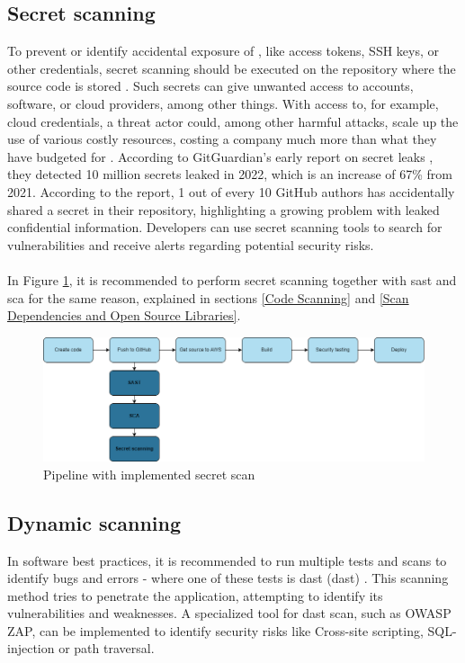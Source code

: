 \subsection{Secret scanning}
To prevent or identify accidental exposure of , like access tokens, SSH keys, or other credentials, secret scanning should be executed on the repository where the source code is stored \cite{GithubSecretScanning}. Such secrets can give unwanted access to accounts, software, or cloud providers, among other things. With access to, for example, cloud credentials, a threat actor could, among other harmful attacks, scale up the use of various costly resources, costing a company much more than what they have budgeted for \cite{GitGuardianexploitexample}. According to GitGuardian's early report on secret leaks \cite{GitGuardiansecretsprawl}, they detected 10 million secrets leaked in 2022, which is an increase of 67\% from 2021. According to the report, 1 out of every 10 GitHub authors has accidentally shared a secret in their repository, highlighting a growing problem with leaked confidential information. Developers can use secret scanning tools to search for vulnerabilities and receive alerts regarding potential security risks. 
\\~\\
In Figure \ref{fig: Pipeline with implemented secret scan}, it is recommended to perform secret scanning together with \acrshort{sast} and \acrshort{sca} for the same reason, explained in sections \ref{Code Scanning} and \ref{Scan Dependencies and Open Source Libraries}.

\vspace{2mm}
\begin{figure}[H]
    \centering
    \includegraphics[width=0.8\columnwidth]{Images/pipeline4.png}
    \caption{Pipeline with implemented secret scan}
    \label{fig: Pipeline with implemented secret scan}
\end{figure}

\subsection{Dynamic scanning}
In software best practices, it is recommended to run multiple tests and scans to identify bugs and errors - where one of these tests is \acrlong{dast} (\acrshort{dast}) \cite{bestpracticeSupplyChain}. This scanning method tries to penetrate the application, attempting to identify its vulnerabilities and weaknesses. A specialized tool for \acrshort{dast} scan, such as OWASP ZAP, can be implemented to identify security risks like
\gls{Cross-site scripting}, \gls{SQL-injection} or path traversal.\cite{dynamictesting}


